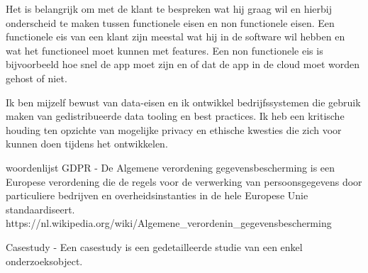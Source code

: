 Het is belangrijk om met de klant te bespreken wat hij graag wil en hierbij onderscheid te maken tussen functionele
eisen en non functionele eisen.
Een functionele eis van een klant zijn meestal wat hij in de software wil hebben en wat het functioneel moet kunnen met features.
Een non functionele eis is bijvoorbeeld hoe snel de app moet zijn en of dat de app in de cloud moet worden gehost of
niet.

Ik ben mijzelf bewust van data-eisen en ik ontwikkel bedrijfssystemen die gebruik maken van gedistribueerde
data tooling en best practices.
Ik heb een kritische houding ten opzichte van mogelijke privacy en ethische kwesties die zich voor kunnen doen
tijdens het ontwikkelen.




\newpage
\bigskip
\bigskip
woordenlijst
GDPR - De Algemene verordening gegevensbescherming is een Europese verordening die de regels voor de verwerking van
persoonsgegevens door particuliere bedrijven en overheidsinstanties in de hele Europese Unie standaardiseert.
https://nl.wikipedia.org/wiki/Algemene\_verordenin\_gegevensbescherming

Casestudy -  Een casestudy is een gedetailleerde studie van een enkel onderzoeksobject.

